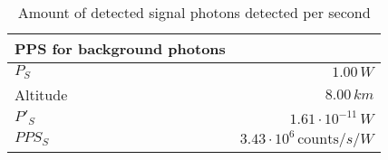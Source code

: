 \begin{table}[H]
\centering
\caption{Amount of detected signal photons detected per second}
\label{tab:PPS_S}
\begin{tabular}{|l|r|}\hline
    \textbf{PPS for background photons} & \\
    \hline 
    $P_S$ & $1.00\,W$ \\
    Altitude & $8.00\, km$ \\
    $P'_S$ & $1.61\cdot10^{-11}\,W$ \\
    $PPS_S$ & $3.43\cdot10^{6}\,\text{counts}/s/W$ \\
    \hline 
\end{tabular}
\end{table}
